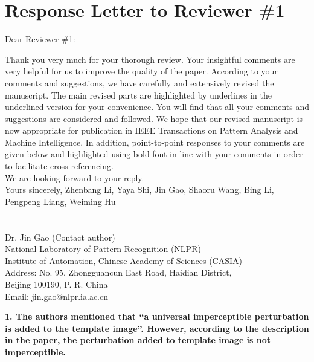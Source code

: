 \documentclass[12pt]{article}
\begin{document}
\newpage
{\centering\section*{Response Letter to Reviewer \#1}}
\noindent Dear Reviewer \#1:

Thank you very much for your thorough review. Your insightful comments are very helpful for us to improve the quality of the paper. According to your comments and suggestions, we have carefully and extensively revised the manuscript. The main revised parts are highlighted by underlines in the underlined version for your convenience. You will find that all your comments and suggestions are considered and followed. We hope that our revised manuscript is now appropriate for publication in IEEE Transactions on Pattern Analysis and Machine Intelligence.
In addition, point-to-point responses to your comments are given below and highlighted using bold font in line with your comments in order to facilitate cross-referencing.\\[10pt]
\indent We are looking forward to your reply.\\[10pt]
\noindent Yours sincerely,
\noindent Zhenbang Li, Yaya Shi, Jin Gao, Shaoru Wang, Bing Li, Pengpeng Liang, Weiming Hu
\\
\\
\\
\noindent Dr. Jin Gao (Contact author)\\
\noindent National Laboratory of Pattern Recognition (NLPR)\\
\noindent Institute of Automation, Chinese Academy of Sciences (CASIA)\\
\noindent Address: No. 95, Zhongguancun East Road, Haidian District,\\
\noindent Beijing 100190, P. R. China\\
\noindent Email: jin.gao@nlpr.ia.ac.cn

\newpage
\textbf{1. The authors mentioned that “a universal imperceptible perturbation is added to the template image”. However, according to the description in the paper, the perturbation added to template image is not imperceptible.}
\end{document}
